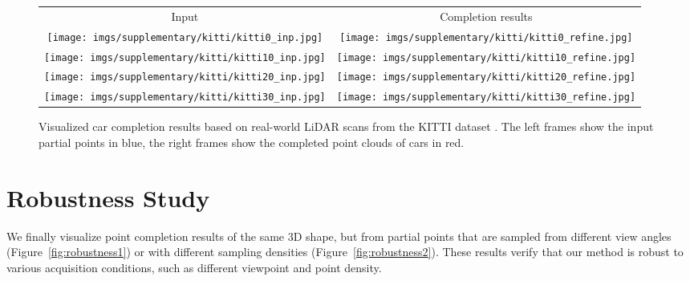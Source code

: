 \documentclass[final]{cvpr}
\renewcommand{\arraystretch}{1.2}
\begin{document}
\begin{figure*}
\center
\setlength\tabcolsep{0pt}
{
\renewcommand{\arraystretch}{0.0}
\small
\begin{tabular}{@{}cc@{}}
    Input & Completion results\\
    
    \texttt{[image: imgs/supplementary/kitti/kitti0\_inp.jpg]}&
    \texttt{[image: imgs/supplementary/kitti/kitti0\_refine.jpg]}\\
    
    \texttt{[image: imgs/supplementary/kitti/kitti10\_inp.jpg]}&
    \texttt{[image: imgs/supplementary/kitti/kitti10\_refine.jpg]}\\
    
    \texttt{[image: imgs/supplementary/kitti/kitti20\_inp.jpg]}&
    \texttt{[image: imgs/supplementary/kitti/kitti20\_refine.jpg]}\\
    
    \texttt{[image: imgs/supplementary/kitti/kitti30\_inp.jpg]}&
    \texttt{[image: imgs/supplementary/kitti/kitti30\_refine.jpg]}\\
       
\end{tabular}
}
\caption{Visualized car completion results based on real-world LiDAR scans from the KITTI dataset \cite{geiger2013vision}. The left frames show the input partial points in blue, the right frames show the completed point clouds of cars in red.}
\label{fig:kitti}
\end{figure*}

\section{Robustness Study}

We finally visualize point completion results of the same 3D shape, but from partial points that are sampled from different view angles (Figure~\ref{fig:robustness1}) or with different sampling densities (Figure~\ref{fig:robustness2}). These results verify that our method is robust to various acquisition conditions, such as different viewpoint and point density.
\end{document}
